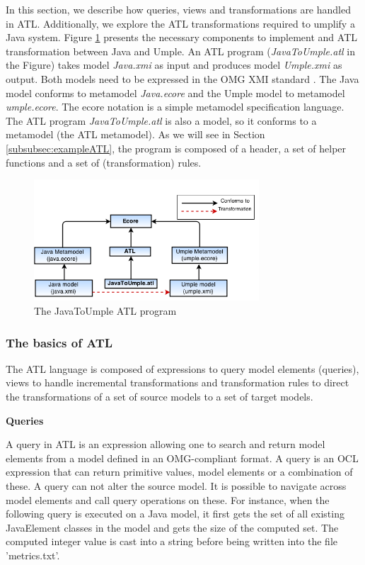 In this section, we describe how queries, views and transformations are handled in ATL. Additionally, we explore the ATL transformations required to umplify a Java system. Figure \ref{fig:atl} presents the necessary components to implement and ATL transformation between Java and Umple. An ATL program (\textit{JavaToUmple.atl} in the Figure) takes model \textit{Java.xmi} as input and produces model \textit{Umple.xmi} as output. Both models need to be expressed in the OMG XMI standard \cite{xmispec}. The Java model conforms to metamodel \textit{Java.ecore} and the Umple model to metamodel \textit{umple.ecore}. The ecore \cite{ecore} notation is a simple metamodel specification language. The ATL program \textit{JavaToUmple.atl} is also a model, so it conforms to a metamodel (the ATL metamodel). As we will see in Section \ref{subsubsec:exampleATL}, the program is composed of a header, a set of helper functions and a set of (transformation) rules.

\begin{figure}[h]
\centering
\includegraphics[width=0.75\textwidth]{Figures/ATL_PROGRAM.png} 
\caption{The JavaToUmple ATL program}
\label{fig:atl}
\end{figure}


\subsubsection{The basics of ATL}

The ATL language is composed of expressions to query model elements (queries), views to handle incremental transformations and transformation rules to direct the transformations of  a set of source models to a set of target models.

\textbf{Queries}

A query in ATL is an expression allowing one to search and return model elements from a model defined in an OMG-compliant format. A query is an OCL expression that can return primitive values, model elements or a combination of these. A query can not alter the source model. It is possible to navigate across model elements and call query operations on these. For instance, when the following query is executed on a Java model, it first gets the set of all existing JavaElement classes in the model and gets the size of the computed set. The computed integer value is cast into a string before being written into the file 'metrics.txt'. 

